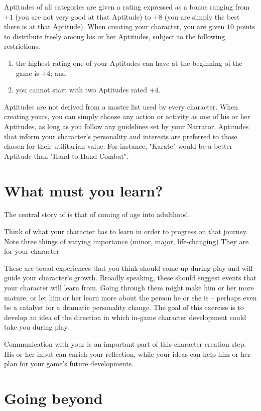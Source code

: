 Aptitudes of all categories are given a rating expressed as a bonus ranging from $+1$ (you are not very good
at that Aptitude) to $+8$ (you are simply the best there is at that Aptitude). When creating your character, you
are given $10$ points to distribute freely among his or her Aptitudes, subject to the following restrictions:
\begin{enumerate}
\item the highest rating one of your Aptitudes can have at the beginning of the game is $+4$; and
\item you cannot start with two Aptitudes rated $+4$.
\end{enumerate}

Aptitudes are not derived from a master list used by every character. When creating yours, you can simply
choose any action or activity as one of his or her Aptitudes, as long as you follow any guidelines set by
your Narrator. Aptitudes that inform your character's personality and interests are preferred to those chosen
for their utilitarian value. For instance, "Karate" would be a better Aptitude than "Hand-to-Hand Combat".

\section{What must you learn?}

The central story of \ParadoxSpaceRPG{} is that of coming of age into adulthood.

Think of what your character has to learn in order to progress on that journey.
Note three things of varying importance (minor, major, life-changing)
They are  for your character

These are broad experiences that you think should come up during play and will guide your character's growth.
Broadly speaking, these should suggest events that your character will learn from. Going through them might
make him or her more mature, or let him or her learn more about the person he or she is -- perhaps even be
a catalyst for a dramatic personality change. The goal of this exercise is to develop an idea of the direction
in which in-game character development could take you during play.

Communication with your \GM{} is an important part of this character creation step. His or her input can enrich
your reflection, while your ideas can help him or her plan for your game's future developments.

\section{Going beyond}


